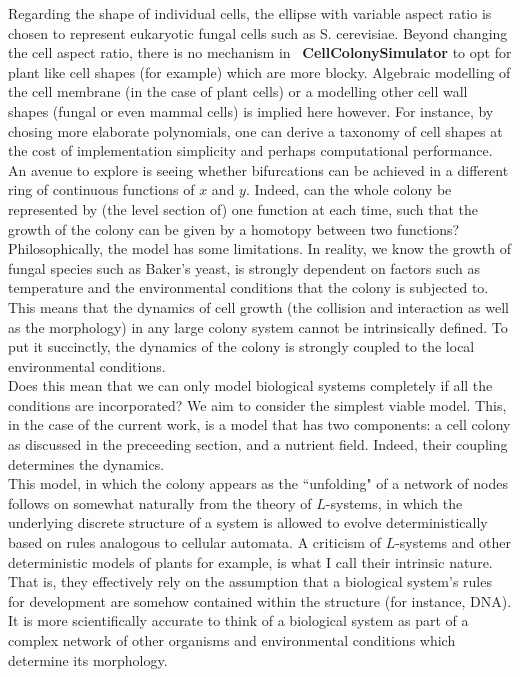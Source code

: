 Regarding the shape of individual cells, 
the ellipse with variable aspect ratio is chosen to represent eukaryotic
fungal cells such as S. cerevisiae. Beyond changing 
the cell aspect ratio, there is no mechanism in \
\textbf{CellColonySimulator}
to opt for plant like cell shapes (for example) which are more blocky.
Algebraic modelling of the cell membrane (in the case of plant cells) or
a modelling other cell wall shapes (fungal or even mammal cells)
is implied here however. For instance, by chosing more elaborate
polynomials, one can derive a taxonomy of cell shapes at the cost of 
implementation simplicity and perhaps computational performance. 
An avenue to explore is seeing whether bifurcations
can be achieved in a different ring of continuous functions of $x$ and $y$.
Indeed, can the whole colony be represented by (the level section of) one function at each time,
such that the growth of the colony can be given by a homotopy 
between two functions?
\\

Philosophically, the model has some limitations. In reality, we know the growth
of fungal species such as Baker's yeast, is strongly dependent on factors such as temperature
and the environmental conditions that the colony is subjected to. This means 
that the dynamics of cell growth (the collision and interaction as well as the morphology) in 
any large colony system cannot be intrinsically defined. To put it succinctly, the dynamics of 
the colony is strongly coupled to the local environmental conditions.
\\

Does this mean that we can only model biological systems completely if all the conditions 
are incorporated? We aim to consider the simplest viable model. This, in the case of the current work, 
is a model that has two components: a cell colony as discussed in the preceeding section, and 
a nutrient field. Indeed, their coupling determines the dynamics. 
\\

This model, in which the colony appears as the ``unfolding" of a network of nodes
follows on somewhat naturally from the theory of $L$-systems, in which the underlying 
discrete structure of a system is allowed to evolve deterministically based on rules
analogous to cellular automata. A criticism of $L$-systems and other deterministic models
of plants for example, is what I call their intrinsic nature. That is, they effectively
rely on the assumption that a biological system's rules for development are somehow contained
within the structure (for instance, DNA). It is more 
scientifically accurate to think of a biological system as part of a complex network 
of other organisms and environmental conditions which determine its morphology.
\\

